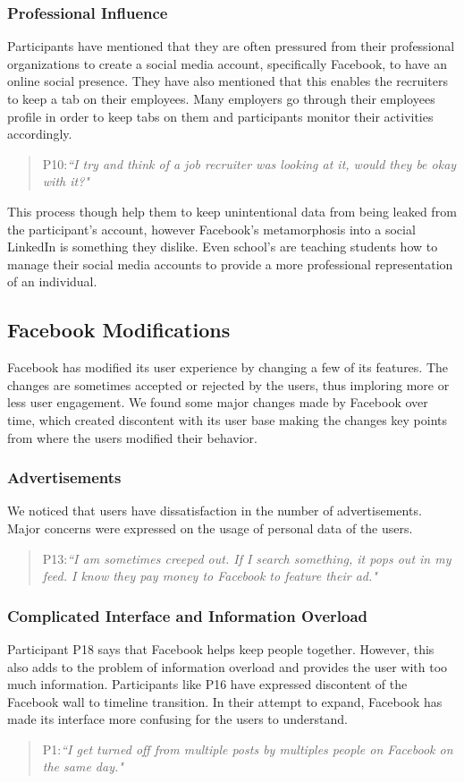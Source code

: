 \subsubsection{Professional Influence}
Participants have mentioned that they are often pressured from their professional organizations to create a social media account, specifically Facebook, to have an online social presence. They have also mentioned that this enables the recruiters to keep a tab on their employees. Many employers go through their employees profile in order to keep tabs on them and participants monitor their activities accordingly.
\begin{quote}
P10:\textit{``I try and think of a job recruiter was looking at it, would they be okay with it?"}
\end{quote}
This process though help them to keep unintentional data from being leaked from the participant's account, however Facebook's metamorphosis into a social LinkedIn is something they dislike. Even school's are teaching students how to manage their social media accounts to provide a more professional representation of an individual.
\subsection{Facebook Modifications}
Facebook has modified its user experience by changing a few of its features. The changes are sometimes accepted or rejected by the users, thus imploring more or less user engagement. We found some major changes made by Facebook over time, which created discontent with its user base making the changes key points from where the users modified their behavior.
\subsubsection{Advertisements}
We noticed that users have dissatisfaction in the number of advertisements. Major concerns were expressed on the usage of personal data of the users. 
\begin{quote}
P13:\textit{``I am sometimes creeped out. If I search something, it pops out in my feed. I know they pay money to Facebook to feature their ad."}
\end{quote}
\subsubsection{Complicated Interface and Information Overload}
Participant P18 says that Facebook helps keep people together. However, this also adds to the problem of information overload and provides the user with too much information. Participants like P16 have expressed discontent of the Facebook wall to timeline transition. In their attempt to expand, Facebook has made its interface more confusing for the users to understand. 
\begin{quote}
P1:\textit{``I get turned off from multiple posts by multiples people on Facebook on the same day."}
\end{quote}
